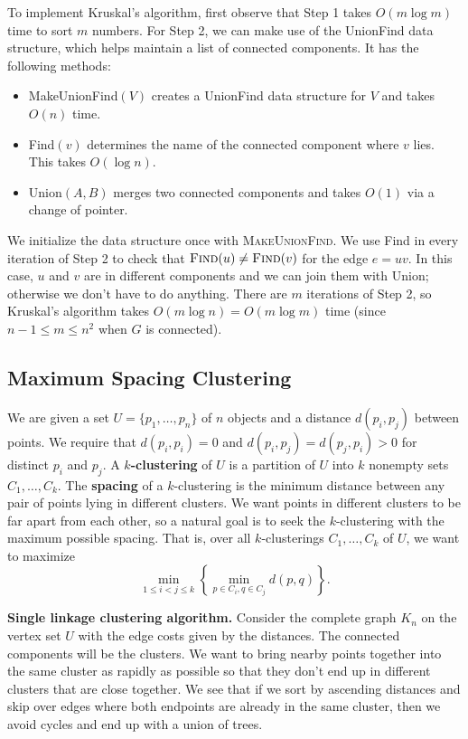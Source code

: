 To implement Kruskal's algorithm, first observe that Step 1 takes 
$O(m\log m)$ time to sort $m$ numbers. For Step 2, we can make use 
of the {\sc UnionFind} data structure, which helps maintain a 
list of connected components. It has the following methods:
\begin{itemize}
    \item {\sc MakeUnionFind}$(V)$ creates a {\sc UnionFind} data structure 
    for $V$ and takes $O(n)$ time. 
    \item {\sc Find}$(v)$ determines the name of the connected component where 
    $v$ lies. This takes $O(\log n)$. 
    \item {\sc Union}$(A, B)$ merges two connected components and takes 
    $O(1)$ via a change of pointer. 
\end{itemize}
We initialize the data structure once with \textsc{MakeUnionFind}.
We use {\sc Find} in every iteration of Step 2 to check that 
$\textsc{Find}(u) \neq \textsc{Find}(v)$ for the edge $e = uv$. In this 
case, $u$ and $v$ are in different components and we can join them with 
{\sc Union}; otherwise we don't have to do anything. There are $m$ iterations 
of Step 2, so Kruskal's algorithm takes $O(m\log n) = O(m\log m)$ 
time (since $n-1 \leq m \leq n^2$ when $G$ is connected).

\subsection{Maximum Spacing Clustering}\label{subsec:2.5}
We are given a set $U = \{p_1, \dots, p_n\}$
of $n$ objects and a distance $d(p_i, p_j)$ between points. 
We require that $d(p_i, p_i) = 0$ and $d(p_i, p_j) = d(p_j, p_i) > 0$ 
for distinct $p_i$ and $p_j$. A {\bf $k$-clustering} of $U$ is a 
partition of $U$ into $k$ nonempty sets $C_1, \dots, C_k$. 
The {\bf spacing} of a $k$-clustering is the minimum distance 
between any pair of points lying in different clusters. We want 
points in different clusters to be far apart from each other, 
so a natural goal is to seek the $k$-clustering 
with the maximum possible spacing. That is, over all 
$k$-clusterings $C_1, \dots, C_k$ of $U$, we want to maximize 
\[ \min_{1\leq i < j\leq k} \left\{ \min_{p\in C_i, q\in C_j} d(p, q) \right\}. \]

{\bf Single linkage clustering algorithm.} Consider the complete
graph $K_n$ on the vertex set $U$ with the edge costs given by 
the distances. The connected components will be the clusters. 
We want to bring nearby points together into the 
same cluster as rapidly as possible so that they don't end up 
in different clusters that are close together. We see that 
if we sort by ascending distances and skip over edges where 
both endpoints are already in the same cluster, then we avoid 
cycles and end up with a union of trees. 


